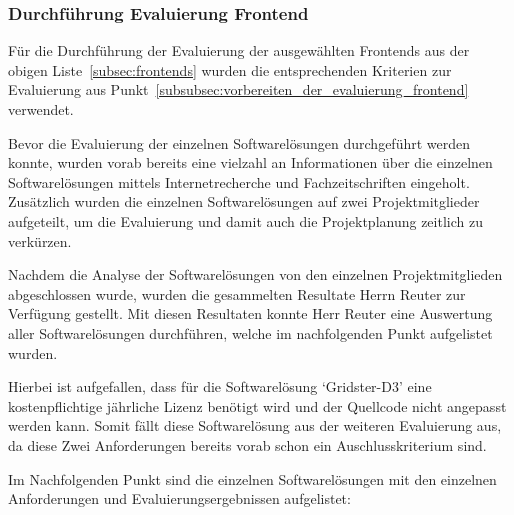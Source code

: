 \subsubsection{Durchführung Evaluierung Frontend}
\label{subsubsec:durchfuehrung_evaluierung_frontend}
Für die Durchführung der Evaluierung der ausgewählten Frontends aus der obigen
Liste~\ref{subsec:frontends} wurden die entsprechenden Kriterien zur
Evaluierung aus Punkt~\ref{subsubsec:vorbereiten_der_evaluierung_frontend}
verwendet.


Bevor die Evaluierung der einzelnen Softwarelösungen durchgeführt werden konnte,
wurden vorab bereits eine vielzahl an Informationen über die einzelnen
Softwarelösungen mittels Internetrecherche und Fachzeitschriften eingeholt.
Zusätzlich wurden die einzelnen Softwarelösungen auf zwei Projektmitglieder
aufgeteilt, um die Evaluierung und damit auch die Projektplanung zeitlich zu
verkürzen.

Nachdem die Analyse der Softwarelösungen von den einzelnen Projektmitglieden
abgeschlossen wurde, wurden die gesammelten Resultate Herrn Reuter zur
Verfügung gestellt. Mit diesen Resultaten konnte Herr Reuter eine Auswertung
aller Softwarelösungen durchführen, welche im nachfolgenden Punkt aufgelistet
wurden.

Hierbei ist aufgefallen, dass für die Softwarelösung `Gridster-D3' eine
kostenpflichtige jährliche Lizenz benötigt wird und der Quellcode nicht
angepasst werden kann. Somit fällt diese Softwarelösung aus der weiteren
Evaluierung aus, da diese Zwei Anforderungen bereits vorab schon ein
Auschlusskriterium sind.

Im Nachfolgenden Punkt sind die einzelnen Softwarelösungen mit den einzelnen
Anforderungen und Evaluierungsergebnissen aufgelistet:

